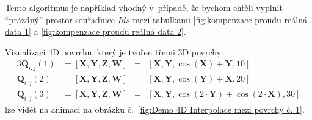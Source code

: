 Tento algoritmus je například vhodný v~případě, že bychom chtěli vyplnit ``prázdný'' prostor souřadnice $Ids$ mezi tabulkami \ref{fig:kompenzace proudu reálná data 1} a \ref{fig:kompenzace proudu reálná data 2}.\par
Vizualizaci 4D povrchu, který je tvořen třemi 3D povrchy:
\begin{alignat}{3}
    \bm{Q}_{i,j}(1) & = [\bm{X}, \bm{Y}, \bm{Z}, \bm{W}] & = & [\bm{X}, \bm{Y}, \cos(\bm{X}) + \bm{Y}, 10]                   \\
    \bm{Q}_{i,j}(2) & = [\bm{X}, \bm{Y}, \bm{Z}, \bm{W}] & = & [\bm{X}, \bm{Y}, \cos(\bm{Y}) + \bm{X}, 20]                   \\
    \bm{Q}_{i,j}(3) & = [\bm{X}, \bm{Y}, \bm{Z}, \bm{W}] & = & [\bm{X}, \bm{Y}, \cos(2\cdot\bm{Y}) + \cos(2\cdot\bm{X}), 30]
\end{alignat}
lze vidět na animaci na obrázku č.~\ref{fig:Demo 4D Interpolace mezi povrchy č. 1}.
